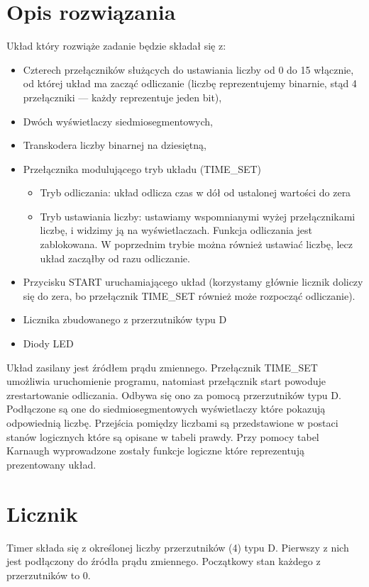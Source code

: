 \documentclass{article}
\begin{document}
    \section{Opis rozwiązania}
    Układ który rozwiąże zadanie będzie składał się z:
    \begin{itemize}
        \item Czterech przełączników służących do ustawiania liczby od 0 do 15 włącznie, od której układ ma zacząć odliczanie 
        (liczbę reprezentujemy binarnie, stąd 4 przełączniki --- każdy reprezentuje jeden bit),
        \item Dwóch wyświetlaczy siedmiosegmentowych,
        \item Transkodera liczby binarnej na dziesiętną,
        \item Przełącznika modulującego tryb układu (TIME\_SET) \begin{itemize}
            \item Tryb odliczania: układ odlicza czas w dół od ustalonej wartości do zera
            \item Tryb ustawiania liczby: ustawiamy wspomnianymi wyżej przełącznikami liczbę, i widzimy ją na wyświetlaczach. Funkcja odliczania jest zablokowana.
            W poprzednim trybie można również ustawiać liczbę, lecz układ zacząłby od razu odliczanie.
        \end{itemize}
        \item Przycisku START uruchamiającego układ (korzystamy głównie licznik doliczy się do zera, bo przełącznik TIME\_SET również może rozpocząć odliczanie).
        \item Licznika zbudowanego z przerzutników typu D
        \item Diody LED
    \end{itemize}
    Układ zasilany jest źródłem prądu zmiennego. Przełącznik TIME\_SET umożliwia uruchomienie programu, natomiast przełącznik
    start powoduje zrestartowanie odliczania. Odbywa się ono za pomocą przerzutników typu D. Podłączone są one do siedmiosegmentowych
    wyświetlaczy które pokazują odpowiednią liczbę. Przejścia pomiędzy liczbami są przedstawione w postaci stanów logicznych 
    które są opisane w tabeli prawdy. Przy pomocy tabel Karnaugh wyprowadzone zostały funkcje logiczne które reprezentują
    prezentowany układ.

    \section{Licznik}
    Timer składa się z określonej liczby przerzutników (4) typu D. Pierwszy z nich jest podłączony do źródła prądu zmiennego. 
    Początkowy stan każdego z przerzutników to 0.
\end{document}
